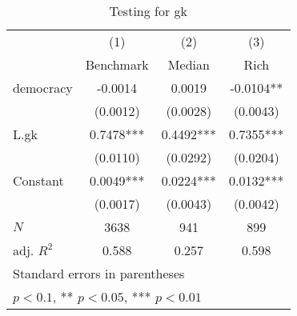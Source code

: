 \begin{table}[htbp]\centering
\def\sym#1{\ifmmode^{#1}\else\(^{#1}\)\fi}
\caption{Testing for gk \label{tab:regression3}}
\begin{tabular}{l*{3}{c}}
\hline\hline
            &\multicolumn{1}{c}{(1)}&\multicolumn{1}{c}{(2)}&\multicolumn{1}{c}{(3)}\\
            &\multicolumn{1}{c}{Benchmark}&\multicolumn{1}{c}{Median}&\multicolumn{1}{c}{Rich}\\
\hline
democracy   &     -0.0014   &      0.0019   &     -0.0104** \\
            &    (0.0012)   &    (0.0028)   &    (0.0043)   \\
[1em]
L.gk        &      0.7478***&      0.4492***&      0.7355***\\
            &    (0.0110)   &    (0.0292)   &    (0.0204)   \\
[1em]
Constant    &      0.0049***&      0.0224***&      0.0132***\\
            &    (0.0017)   &    (0.0043)   &    (0.0042)   \\
\hline
\(N\)       &        3638   &         941   &         899   \\
adj. \(R^{2}\)&       0.588   &       0.257   &       0.598   \\
\hline\hline
\multicolumn{4}{l}{\footnotesize Standard errors in parentheses}\\
\multicolumn{4}{l}{\footnotesize * \(p<0.1\), ** \(p<0.05\), *** \(p<0.01\)}\\
\end{tabular}
\end{table}
